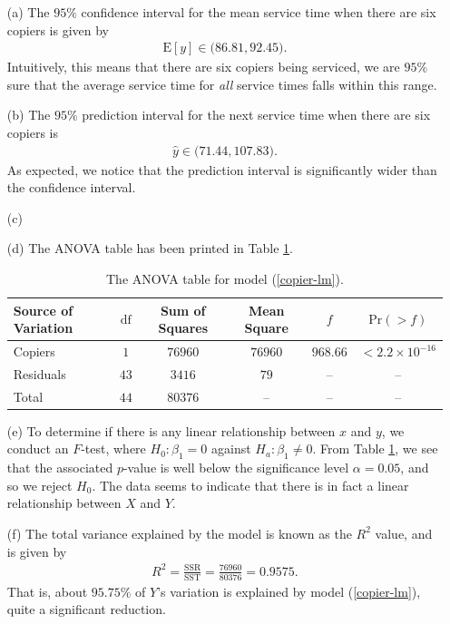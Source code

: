 \documentclass[10pt]{article}
\begin{document}
\begin{itemize}
    \item[(a)] The \(95\%{}\) confidence interval for the mean service time when there are six copiers is given by 
    \begin{align*}
        \mathrm{E}[y] \in \Big(86.81, 92.45 \Big).
    \end{align*}
    Intuitively, this means that there are six copiers being serviced, we are \(95\%{}\) sure that the average service time for 
    \textsl{all} service times falls within this range. 
    \item[(b)] The \(95\%{}\) prediction interval for the next service time when there are six copiers is 
    \begin{align*}
        \widehat{y} \in \Big( 71.44, 107.83 \Big).
    \end{align*}
    As expected, we notice that the prediction interval is significantly wider than the confidence interval. 
    \item[(c)] 
    \item[(d)] The ANOVA table has been printed in Table \ref{copier-anova}.
    \begin{table}
        \centering
        \def\arraystretch{1.25}
        \begin{tabular}[ht]{lccccc} \toprule
            Source of Variation & \(\mathrm{df}\) & Sum of Squares & Mean Square & \(f\) & \(\mathrm{Pr}(> f)\) \\\midrule
            Copiers & \(1\) & \(76960\) & \(76960\) & \(968.66\) & \(< 2.2 \times 10^{-16}\) \\
            Residuals & \(43\) & \(3416\) & \(79\) & -- & -- \\
            Total & \(44\) & \(80376\) & -- & -- & -- \\\bottomrule
        \end{tabular}
        \caption{The ANOVA table for model (\ref{copier-lm}).}
        \label{copier-anova}
    \end{table}
    \item[(e)] To determine if there is any linear relationship between \(x\) and \(y\), we conduct an \(F\)-test, where 
    \(H_0 : \beta_1 = 0\) against \(H_a : \beta_1 \neq 0\). From Table \ref{copier-anova}, we see that the associated \(p\)-value is 
    well below the significance level \(\alpha = 0.05\), and so we reject \(H_0\). The data seems to indicate that there is in fact a 
    linear relationship between \(X\) and \(Y\).
    \item[(f)] The total variance explained by the model is known as the \(R^2\) value, and is given by
    \begin{align*}
        R^2 = \frac{\mathrm{SSR}}{\mathrm{SST}} = \frac{76960}{80376} = 0.9575.
    \end{align*}
    That is, about \(95.75\%{}\) of \(Y\)'s variation is explained by model (\ref{copier-lm}), quite a significant reduction. 
\end{itemize}
\end{document}
